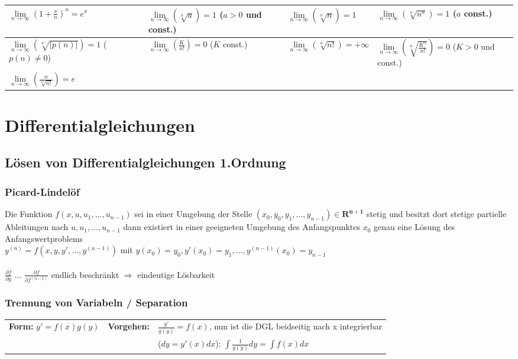 \begin{tabular}{| l | l | l | l |}
	\hline
		$\lim\limits_{n\to\infty}(1+\frac{x}{n})^n = e^x$ &
		$\lim\limits_{n\to\infty}(\sqrt[n]{a}) = 1$ ($a > 0$ und const.) &
		$\lim\limits_{n\to\infty}(\sqrt[n]{n}) = 1$ &
		$\lim\limits_{n\to\infty}(\sqrt[n]{n^a}) = 1$ ($a$ const.)\\
	\hline
		$\lim\limits_{n\to\infty}(\sqrt[n]{|p(n)|}) = 1$ ($p(n) \neq 0$) &
		$\lim\limits_{n\to\infty}(\frac{K}{n!}) = 0$ ($K$ const.) &
		$\lim\limits_{n\to\infty}(\sqrt[n]{n!}) = +\infty$ &
		$\lim\limits_{n\to\infty}(\sqrt[n]{\frac{K^n}{n!}}) = 0$ ($K > 0$ und const.)\\
	\hline
		$\lim\limits_{n\to\infty}(\frac{n}{\sqrt[n]{n!}}) = e$ &&&\\
	\hline		
\end{tabular}


\section{Differentialgleichungen}

\subsection{Lösen von Differentialgleichungen 1.Ordnung}

\subsubsection{Picard-Lindelöf}
Die Funktion $f(x, u, u_1, ..., u_{n-1})$ sei in einer Umgebung der Stelle $(x_0, y_0, y_1, ..., y_{n-1}) \in \mathbf{R^{n+1}}$ stetig und besitzt dort stetige partielle Ableitungen
nach $u, u_1, ..., u_{n-1}$ dann existiert in einer geeigneten Umgebung des Anfangspunktes $x_0$ genau eine Lösung des Anfangswertproblems\\
$y^{(n)} = f(x, y, y', ...,y^{(n-1)})$ mit $y(x_0) = y_0, y'(x_0) = y_1, ..., y^{(n-1)}(x_0) = y_{n-1}$ \\ \\
$\frac{\partial f}{\partial y}$ ... $\frac{\partial f}{\partial f^{(n-1)}}$ endlich beschränkt $\Rightarrow$ eindeutige Lösbarkeit



\subsubsection{Trennung von Variabeln / Separation }
\begin{tabular}{p{4cm}p{1.5cm}p{10.5cm}}
\textbf{Form:} $y' = f(x) g(y)$ &
\textbf{Vorgehen:}              &
$\frac{y'}{g(y)} = f(x)$, nun ist die DGL beidseitig nach x integrierbar\\  &&
($dy = y'(x) dx$): $\int \frac{1}{g(y)} dy = \int f(x) dx$ 
\end{tabular}


